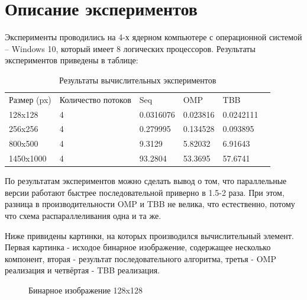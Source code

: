 \documentclass{report}
\begin{document}
\section*{Описание экспериментов}
Эксперименты проводились на 4-х ядерном компьютере с операционной системой – Windows 10, который имеет 8 логических процессоров. Результаты экспериментов приведены в таблице:
\begin{table}[!h]
\caption{Результаты вычислительных экспериментов}
\centering
\begin{tabular}{llllll}
Размер (px) & Количество потоков & Seq & OMP & TBB \\
128x128 & 4 & 0.0316076 & 0.023816 & 0.0242111\\
256x256 & 4 & 0.279995 & 0.134528 & 0.093895\\
800x500 & 4 & 9.3129 & 5.82032 & 6.91643\\
1450x1000 & 4 & 93.2804 & 53.3695 & 57.6741\\
\end{tabular}
\end{table}
\par
По результатам экспериментов можно сделать вывод о том, что параллельные версии работают быстрее последовательной приверно в 1.5-2 раза. При этом, разница в производительности OMP и TBB не велика, что естественно, потому что схема распараллеливания одна и та же.
\par
Ниже привидены картинки, на которых производился вычислительный элемент. Первая картинка - исходое бинарное изображение, содержащее несколько компонент, вторая - результат последовательного алгоритма, третья - OMP реализация и четвёртая - TBB реализация. 

\begin{figure}[H]
\caption{Бинарное изображение 128x128}
\end{figure}
\end{document}

